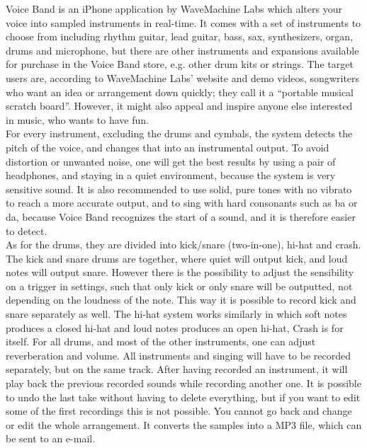 Voice Band is an iPhone application by WaveMachine Labs which alters your voice into sampled instruments in real-time. It comes with a set of instruments to choose from including rhythm guitar, lead guitar, bass, sax, synthesizers, organ, drums and microphone, but there are other instruments and expansions available for purchase in the Voice Band store, e.g. other drum kits or strings. The target users are, according to WaveMachine Labs’ website and demo videos, songwriters who want an idea or arrangement down quickly; they call it a “portable musical scratch board”. However, it might also appeal and inspire anyone else interested in music, who wants to have fun. \\

For every instrument, excluding the drums and cymbals, the system detects the pitch of the voice, and changes that into an instrumental output. To avoid distortion or unwanted noise, one will get the best results by using a pair of headphones, and staying in a quiet environment, because the system is very sensitive sound. It is also recommended to use solid, pure tones with no vibrato to reach a more accurate output, and to sing with hard consonants such as ba or da, because Voice Band recognizes the start of a sound, and it is therefore easier to detect.  \\

As for the drums, they are divided into kick/snare (two-in-one), hi-hat and crash. The kick and snare drums are together, where quiet will output kick, and loud notes will output snare. However there is the possibility to adjust the sensibility on a trigger in settings, such that only kick or only snare will be outputted, not depending on the loudness of the note. This way it is possible to record kick and snare separately as well. The hi-hat system works similarly in which soft notes produces a closed hi-hat and loud notes produces an open hi-hat, Crash is for itself. For all drums, and most of the other instruments, one can adjust reverberation and volume. 
All instruments and singing will have to be recorded separately, but on the same track. After having recorded an instrument, it will play back the previous recorded sounds while recording another one. It is possible to undo the last take without having to delete everything, but if you want to edit some of the first recordings this is not possible.  You cannot go back and change or edit the whole arrangement. It converts the samples into a MP3 file, which can be sent to an e-mail. 

